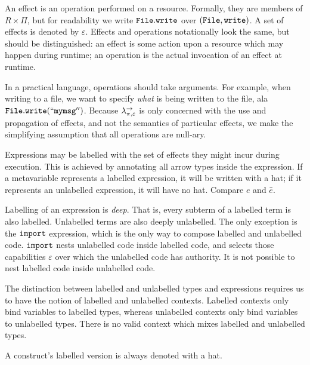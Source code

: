 An effect is an operation performed on a resource. Formally, they are members of $R \times \Pi$, but for readability we write $\mathtt{File.write}$ over $\mathtt{(File, write)}$. A set of effects is denoted by $\varepsilon$. Effects and operations notationally look the same, but should be distinguished: an effect is some action upon a resource which may happen during runtime; an operation is the actual invocation of an effect at runtime.

In a practical language, operations should take arguments. For example, when writing to a file, we want to specify \textit{what} is being written to the file, ala $\mathtt{File.write(``my msg'')}$. Because $\lambda^{\rightarrow}_{\pi, \varepsilon}$ is only concerned with the use and propagation of effects, and not the semantics of particular effects, we make the simplifying assumption that all operations are null-ary.

Expressions may be labelled with the set of effects they might incur during execution. This is achieved by annotating all arrow types inside the expression. If a metavariable represents a labelled expression, it will be written with a hat; if it represents an unlabelled expression, it will have no hat. Compare $e$ and $\hat e$.

Labelling of an expression is \textit{deep}. That is, every subterm of a labelled term is also labelled. Unlabelled terms are also deeply unlabelled. The only exception is the $\mathtt{import}$ expression, which is the only way to compose labelled and unlabelled code. $\mathtt{import}$ nests unlabelled code inside labelled code, and selects those capabilities $\varepsilon$ over which the unlabelled code has authority. It is not possible to nest labelled code inside unlabelled code.

The distinction between labelled and unlabelled types and expressions requires us to have the notion of labelled and unlabelled contexts. Labelled contexts only bind variables to labelled types, whereas unlabelled contexts only bind variables to unlabelled types. There is no valid context which mixes labelled and unlabelled types.

A construct's labelled version is always denoted with a hat. \\

